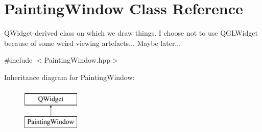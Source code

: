 \hypertarget{class_d_o_1_1_painting_window}{\section{Painting\-Window Class Reference}
\label{class_d_o_1_1_painting_window}
}


Q\-Widget-\/derived class on which we draw things. I choose not to use Q\-G\-L\-Widget because of some weird viewing artefacts... Maybe later...  




{\ttfamily \#include $<$Painting\-Window.\-hpp$>$}

Inheritance diagram for Painting\-Window\-:\begin{figure}[H]
\begin{center}
\leavevmode
\includegraphics[height=2.000000cm]{class_d_o_1_1_painting_window}
\end{center}
\end{figure}
